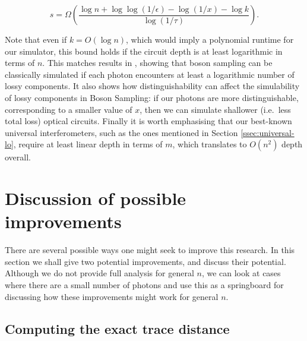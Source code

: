 \begin{equation}
s = \Omega\left(\frac{\log n + \log\log(1/\epsilon)-\log(1/x)-\log k}{\log(1/\tau)}\right).
\end{equation}

Note that even if $k=O(\log n)$, which would imply a polynomial runtime for our simulator, this bound holds if the circuit depth is at least logarithmic in terms of $n$. This matches results in \cite{garciapatron2017,oszmaniec2018}, showing that boson sampling can be classically simulated if each photon encounters at least a logarithmic number of lossy components. 
It also shows how distinguishability can affect the simulability of lossy components in Boson Sampling: if our photons are more distinguishable, corresponding to a smaller value of $x$, then we can simulate shallower (i.e.\ less total loss) optical circuits. Finally it is worth emphasising that our best-known universal interferometers, such as the ones mentioned in Section \ref{ssec:universal-lo}, require at least linear depth in terms of $m$, which translates to $O(n^2)$ depth overall.

\section{Discussion of possible improvements}
\label{sec:small-photon-no}

There are several possible ways one might seek to improve this research. In this section we shall give two potential improvements, and discuss their potential. Although we do not provide full analysis for general $n$, we can look at cases where there are a small number of photons and use this as a springboard for discussing how these improvements might work for general $n$.

\subsection{Computing the exact trace distance}
\label{ssec:exact-trace-distance}

